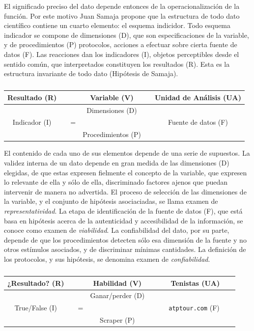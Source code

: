 \documentclass[a4paper,10pt]{book}
\begin{document}
El significado preciso del dato depende entonces de la operacionalización de la función. 
% 
Por este motivo Juan Samaja propone que la estructura de todo dato científico contiene un cuarto elemento: el esquema indicidor.
%
Todo esquema indicador se compone de dimensiones (D), que son especificaciones de la variable, y de procedimientos (P) protocolos, acciones a efectuar sobre cierta fuente de datos (F).
%
Las reacciones dan los indicadores (I), objetos perceptibles desde el sentido común, que interpretados constituyen los resultados (R).
%
Esta es la estructura invariante de todo dato (Hipótesis de Samaja).
%
\begin{table}[ht!]
\centering
\begin{tabular}{clcccc}
Resultado (R) & \multicolumn{1}{r|}{} &  & Variable (V) &  &  \multicolumn{1}{|c}{Unidad de Análisis (UA)} \\ \hline
   &  \multicolumn{1}{r|}{}    &  & Dimensiones (D) &  & \multicolumn{1}{|r}{} \\
                 Indicador (I)  &   & =  &  &  &  Fuente de datos (F) \\
 & \multicolumn{1}{r|}{} &  & Procedimientos (P) &        &    \multicolumn{1}{|r}{}  
\end{tabular}
\caption{}
\label{tab:matriz_datos}
\end{table}
%
El contenido de cada uno de sus elementos depende de una serie de supuestos.
%
La validez interna de un dato depende en gran medida de las dimensiones (D) elegidas, de que estas expresen fielmente el concepto de la variable, que expresen lo relevante de ella y sólo de ella, discriminado factores ajenos que puedan intervenir de manera no advertida.
%
El proceso de selección de las dimensiones de la variable, y el conjunto de hipótesis asociaciadas, se llama examen de \emph{representatividad}.
%
La etapa de identificación de la fuente de datos (F), que está basa en hipótesis acerca de la autenticidad y accesibilidad de la información, se conoce como examen de \emph{viabilidad}.
%
La confiabilidad del dato, por su parte, depende de que los procedimientos detecten sólo esa dimensión de la fuente y no otros estímulos asociados, y de discriminar mínimas cantidades.
%
La definición de los protocolos, y sus hipótesis, se denomina examen de \emph{confiabilidad}.
%
\begin{table}[ht!]
\centering
\begin{tabular}{clcccc}
¿Resultado? (R) & \multicolumn{1}{r|}{} &  & Habilidad (V) &  &  \multicolumn{1}{|c}{Tenistas (UA)} \\ \hline
   &  \multicolumn{1}{r|}{}    &  & Ganar/perder (D) &  & \multicolumn{1}{|r}{} \\
                 True/False (I)  &   & =  &  &  & \ \ \ \texttt{atptour.com} (F) \ \ \  \\
 & \multicolumn{1}{r|}{} &  & Scraper (P) &        &      \multicolumn{1}{|r}{}
\end{tabular}
\caption{}
\label{tab:operacionalizacion_habilidad}
\end{table}
%
\end{document}
